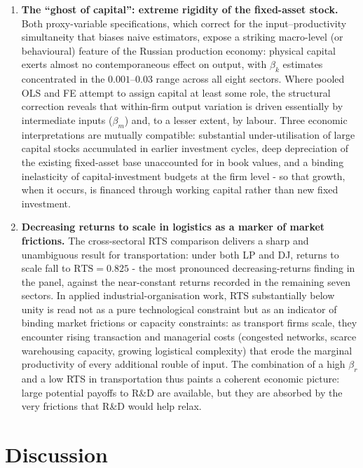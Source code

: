 \documentclass[a4paper, 12pt]{article}
\begin{document}
\begin{enumerate}
    \item \textbf{The ``ghost of capital'': extreme rigidity of the fixed-asset stock.} Both proxy-variable specifications, which correct for the input--productivity simultaneity that biases naive estimators, expose a striking macro-level (or behavioural) feature of the Russian production economy: physical capital exerts almost no contemporaneous effect on output, with $\beta_k$ estimates concentrated in the $0.001$--$0.03$ range across all eight sectors. Where pooled OLS and FE attempt to assign capital at least some role, the structural correction reveals that within-firm output variation is driven essentially by intermediate inputs ($\beta_m$) and, to a lesser extent, by labour. Three economic interpretations are mutually compatible: substantial under-utilisation of large capital stocks accumulated in earlier investment cycles, deep depreciation of the existing fixed-asset base unaccounted for in book values, and a binding inelasticity of capital-investment budgets at the firm level - so that growth, when it occurs, is financed through working capital rather than new fixed investment.

    \item \textbf{Decreasing returns to scale in logistics as a marker of market frictions.} The cross-sectoral RTS comparison delivers a sharp and unambiguous result for transportation: under both LP and DJ, returns to scale fall to $\text{RTS} = 0.825$ - the most pronounced decreasing-returns finding in the panel, against the near-constant returns recorded in the remaining seven sectors. In applied industrial-organisation work, RTS substantially below unity is read not as a pure technological constraint but as an indicator of binding market frictions or capacity constraints: as transport firms scale, they encounter rising transaction and managerial costs (congested networks, scarce warehousing capacity, growing logistical complexity) that erode the marginal productivity of every additional rouble of input. The combination of a high $\beta_r$ and a low RTS in transportation thus paints a coherent economic picture: large potential payoffs to R\&D are available, but they are absorbed by the very frictions that R\&D would help relax.
\end{enumerate}

\section{Discussion}
\end{document}
